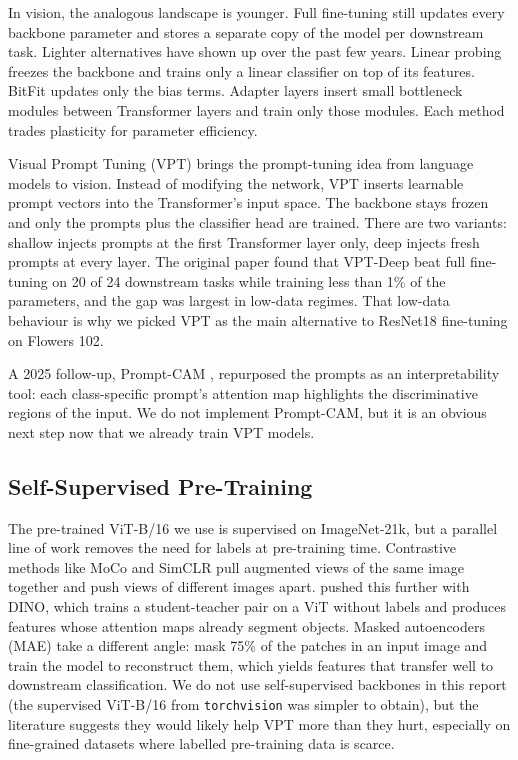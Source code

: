 In vision, the analogous landscape is younger. Full fine-tuning still updates every backbone parameter and stores a separate copy of the model per downstream task. Lighter alternatives have shown up over the past few years. Linear probing freezes the backbone and trains only a linear classifier on top of its features. BitFit updates only the bias terms. Adapter layers \citep{jia2022vpt} insert small bottleneck modules between Transformer layers and train only those modules. Each method trades plasticity for parameter efficiency.

Visual Prompt Tuning (VPT) \citep{jia2022vpt} brings the prompt-tuning idea from language models to vision. Instead of modifying the network, VPT inserts learnable prompt vectors into the Transformer's input space. The backbone stays frozen and only the prompts plus the classifier head are trained. There are two variants: shallow injects prompts at the first Transformer layer only, deep injects fresh prompts at every layer. The original paper found that VPT-Deep beat full fine-tuning on 20 of 24 downstream tasks while training less than 1\% of the parameters, and the gap was largest in low-data regimes. That low-data behaviour is why we picked VPT as the main alternative to ResNet18 fine-tuning on Flowers 102.

A 2025 follow-up, Prompt-CAM \citep{chowdhury2025promptcam}, repurposed the prompts as an interpretability tool: each class-specific prompt's attention map highlights the discriminative regions of the input. We do not implement Prompt-CAM, but it is an obvious next step now that we already train VPT models.

\subsection{Self-Supervised Pre-Training}

The pre-trained ViT-B/16 we use is supervised on ImageNet-21k, but a parallel line of work removes the need for labels at pre-training time. Contrastive methods like MoCo and SimCLR pull augmented views of the same image together and push views of different images apart. \citet{caron2021dino} pushed this further with DINO, which trains a student-teacher pair on a ViT without labels and produces features whose attention maps already segment objects. Masked autoencoders (MAE) \citep{he2022mae} take a different angle: mask 75\% of the patches in an input image and train the model to reconstruct them, which yields features that transfer well to downstream classification. We do not use self-supervised backbones in this report (the supervised ViT-B/16 from \texttt{torchvision} was simpler to obtain), but the literature suggests they would likely help VPT more than they hurt, especially on fine-grained datasets where labelled pre-training data is scarce.

